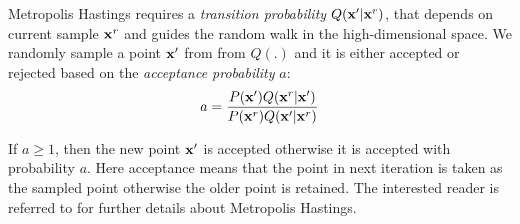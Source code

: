 \documentclass[letterpaper, 10 pt, conference]{ieeeconf} %
\begin{document}

Metropolis Hastings requires a \emph{transition probability} $Q(\mathbf{x}'|
\mathbf{x}^r)$, that depends on current sample $\mathbf{x}^r$ and guides
the random walk in the high-dimensional space. We randomly sample a point
$\mathbf{x}'$ from from $Q(.)$ and it is either accepted or rejected based on the
\emph{acceptance probability} $a$:
\begin{align}
  a = \frac{P(\mathbf{x}')Q(\mathbf{x}^r| \mathbf{x}')}
  {P(\mathbf{x}^r)Q(\mathbf{x}'| \mathbf{x}^r)}
\end{align}

If $a \ge 1$, then the new point $\mathbf{x}'$ is accepted otherwise it is accepted with probability $a$. Here acceptance means that the point in next iteration is taken as the sampled point otherwise the older point is retained.
The interested reader is referred to \cite{mackay1998introduction,LiBOOK2002} for further details about Metropolis Hastings.
\end{document}

